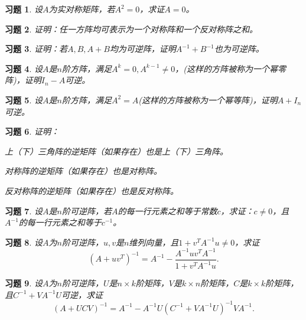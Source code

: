 \documentclass[a4paper]{book}
\newtheorem{ex}{习题}[chapter]
\newcommand{\enum}{\begin{list}{}{\setlength{\leftmargin}{0pt} \setlength{\itemindent}{2.5em} \setlength{\listparindent}{2em}}}
\begin{document}
\begin{ex} \label{ex:3.23}
设$A$为实对称矩阵，若$A^2 = 0$，求证$A = 0$。
\end{ex}

\begin{ex} \label{ex:3.24}
证明：任一方阵均可表示为一个对称阵和一个反对称阵之和。
\end{ex}

\begin{ex} \label{ex:3.25}
证明：若$A, B, A + B$均为可逆阵，证明$A^{-1} + B^{-1}$也为可逆阵。
\end{ex}

\begin{ex} \label{ex:3.26}
设$A$是$n$阶方阵，满足$A^k = 0, A^{k-1} \neq 0$，(这样的方阵被称为一个幂零阵)，证明$I_n - A$可逆。
\end{ex}

\begin{ex} \label{ex:3.27}
设$A$是$n$阶方阵，满足$A^2 = A$(这样的方阵被称为一个幂等阵)，证明$A + I_n$可逆。
\end{ex}

\begin{ex} \label{ex:3.28}
证明：
\enum
\item[(1)] 上（下）三角阵的逆矩阵（如果存在）也是上（下）三角阵。
\item[(2)] 对称阵的逆矩阵（如果存在）也是对称阵。
\item[(3)] 反对称阵的逆矩阵（如果存在）也是反对称阵。
\end{list}
\end{ex}

\begin{ex} \label{ex:3.29}
设$A$是$n$阶可逆阵，若$A$的每一行元素之和等于常数$c$，求证：$c\neq 0$，且$A^{-1}$的每一行元素之和等于$c^{-1}$。
\end{ex}

\begin{ex} \label{ex:3.30}
设$A$为$n$阶可逆阵，$u,v$是$n$维列向量，且$1 + v^T A^{-1}u \neq 0$，求证
$$(A+uv^T)^{-1} = A^{-1} - \frac{A^{-1}uv^T A^{-1}}{1 + v^T A^{-1}u}.$$
\end{ex}

\begin{ex} \label{ex:3.31}
设$A$为$n$阶可逆阵，$U$是$n\times k$阶矩阵，$V$是$k\times n$阶矩阵，$C$是$k\times k$阶矩阵，且$ C^{-1}+VA^{-1}U$可逆，求证
$$ \left(A+UCV \right)^{-1} = A^{-1} - A^{-1}U \left(C^{-1}+VA^{-1}U \right)^{-1} VA^{-1}.$$
\end{ex}

\newpage
\end{document}
